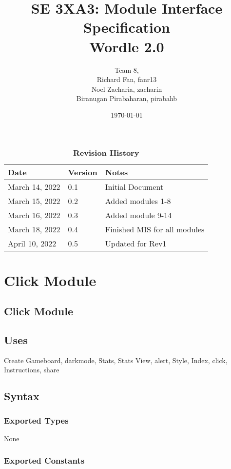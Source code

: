 \documentclass[12pt]{article}
\title{SE 3XA3: Module Interface Specification\\ Wordle 2.0}
\author{Team 8,
	\\ Richard Fan, fanr13
	\\ Noel Zacharia, zacharin
	\\ Biranugan Pirabaharan, pirabahb
}
\date{\today}
\begin{document}
 
\maketitle
\newpage
\tableofcontents
\listoftables
\listoffigures

\newpage
\begin{table}[h]
\caption{\bf Revision History}
\begin{tabularx}{\textwidth}{p{3cm}p{2cm}X}
\toprule {\bf Date} & {\bf Version} & {\bf Notes}\\
\midrule
March 14, 2022 & 0.1 & Initial Document\\
March 15, 2022 & 0.2 & Added modules 1-8\\
March 16, 2022 & 0.3 & Added module 9-14\\
March 18, 2022 & 0.4 & Finished MIS for all modules\\
April 10, 2022 & 0.5 & Updated for Rev1\\
\bottomrule
\end{tabularx}
\end{table}

\newpage

\section {Click Module}

\subsection* {Click Module}

\subsection* {Uses}

Create Gameboard, darkmode, Stats, Stats View, alert, Style, Index, click, Instructions, share

\subsection* {Syntax}

\subsubsection* {Exported Types}

None

\subsubsection* {Exported Constants}
\end{document}
